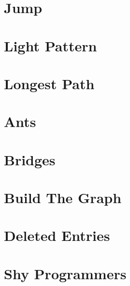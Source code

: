 \documentclass[a4paper, 10pt]{article}
\let\stdsection\section
\renewcommand\section{\newpage\stdsection}
\newcommand{\includecode}[1]{
    }
\newcommand{\algoAuthor}{2} %
\begin{document}
    \section{Jump}
        \includecode{../problems/w03/Jump/Jump\algoAuthor.cpp}
        
    \section{Light Pattern}
        \includecode{../problems/w03/Light_Pattern/LightPattern\algoAuthor.cpp}
        
    \section{Longest Path}
        \includecode{../problems/w03/Longest_Path/LongestPath\algoAuthor.cpp}
             
              
    \section{Ants}
        \includecode{../problems/w04/Ants/Ants\algoAuthor.cpp}
        
    \section{Bridges}
        \includecode{../problems/w04/Bridges/Bridges\algoAuthor.cpp}
        
    \section{Build The Graph}
        \includecode{../problems/w04/Build_The_Graph/BuildTheGraph\algoAuthor.cpp}
        
    \section{Deleted Entries}
        \includecode{../problems/w04/Deleted_Entries/DeletedEntries\algoAuthor.cpp}
    
    \section{Shy Programmers}
        \includecode{../problems/w04/Shy_Programmers/ShyProgrammers\algoAuthor.cpp}
\end{document}

